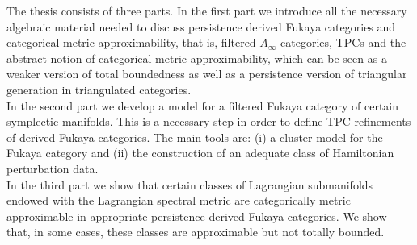 The thesis consists of three parts. In the first part we introduce all the necessary algebraic material needed to discuss persistence derived Fukaya categories and categorical metric approximability, that is, filtered $A_\infty$-categories, TPCs and the abstract notion of categorical metric approximability, which can be seen as a weaker version of total boundedness as well as a persistence version of triangular generation in triangulated categories. \\ In the second part we develop a model for a filtered Fukaya category of certain symplectic manifolds. This is a necessary step in order to define TPC refinements of derived Fukaya categories. The main tools are: (i) a cluster model for the Fukaya category and (ii) the construction of an adequate class of Hamiltonian perturbation data.\\
In the third part we show that certain classes of Lagrangian submanifolds endowed with the Lagrangian spectral metric are categorically metric approximable in appropriate persistence derived Fukaya categories. We show that, in some cases, these classes are approximable but not totally bounded.
